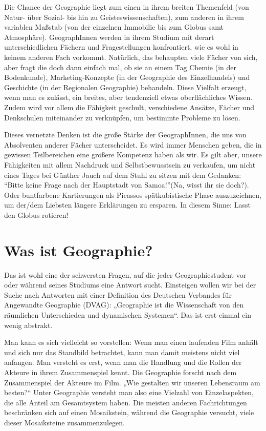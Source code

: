 Die Chance der Geographie liegt zum einen in ihrem breiten Themenfeld (von Natur- über Sozial- bis hin zu Geisteswissenschaften), zum anderen in ihrem variablen Maßstab (von der einzelnen Immobilie bis zum Globus samt Atmosphäre). GeographInnen werden in ihrem Studium mit derart unterschiedlichen Fächern und Fragestellungen konfrontiert, wie es wohl in keinem anderen Fach vorkommt. Natürlich, das behaupten viele Fächer von sich, aber fragt die doch dann einfach mal, ob sie an einem Tag Chemie (in der Bodenkunde), Marketing-Konzepte (in der Geographie des Einzelhandels) und Geschichte (in der Regionalen Geographie) behandeln. Diese Vielfalt erzeugt, wenn man es zulässt, ein breites, aber tendenziell etwas oberflächliches Wissen. Zudem wird vor allem die Fähigkeit geschult, verschiedene Ansätze, Fächer und Denkschulen miteinander zu verknüpfen, um bestimmte Probleme zu lösen.

Dieses vernetzte Denken ist die große Stärke der GeographInnen, die uns von Absolventen anderer Fächer unterscheidet. Es wird immer Menschen geben, die in gewissen Teilbereichen eine größere Kompetenz haben als wir. Es gilt aber, unsere Fähigkeiten mit allem Nachdruck und Selbstbewusstsein zu verkaufen, um nicht eines Tages bei Günther Jauch auf dem Stuhl zu sitzen mit dem Gedanken: "`Bitte keine Frage nach der Hauptstadt von Samoa!"'(Na, wisst ihr sie doch?). Oder buntfarbene Kartierungen als Picassos spätkubistische Phase auszuzeichnen, um der/dem Liebsten längere Erklärungen zu ersparen. In diesem Sinne: Lasst den Globus rotieren!

\section*{Was ist Geographie?}
Das ist wohl eine der schwersten Fragen, auf die jeder Geographiestudent vor oder während seines Studiums eine Antwort sucht. Einsteigen wollen wir bei der Suche nach Antworten mit einer Deﬁnition des Deutschen Verbandes für Angewandte Geographie (DVAG): „Geographie ist die Wissenschaft von den räumlichen Unterschieden und dynamischen Systemen“. Das ist erst einmal ein wenig abstrakt.

Man kann es sich vielleicht so vorstellen: Wenn man einen laufenden Film anhält und sich nur das Standbild betrachtet, kann man damit meistens nicht viel anfangen. Man versteht es erst, wenn man die Handlung und die Rollen der Akteure in ihrem Zusammenspiel kennt. Die Geographie forscht nach dem Zusammenspiel der Akteure im Film. „Wie gestalten wir unseren Lebensraum am besten?“ Unter Geographie versteht man also eine Vielzahl von Einzelaspekten, die alle Anteil am Gesamtsystem haben. Die meisten anderen Fachrichtungen beschränken sich auf einen Mosaikstein, während die Geographie versucht, viele dieser Mosaiksteine zusammenzulegen.

